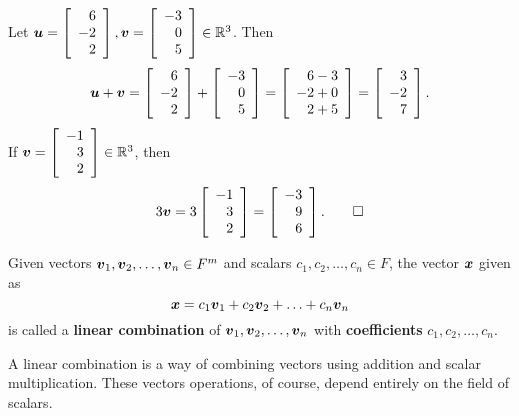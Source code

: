 \begin{Exam} Let $\bb u = \vr{ 6\\-2\\ 2}, \bb v = \vr{ -3\\0\\ 5} \in \R^3$. Then 
\[\bb u + \bb v = \vr{ 6\\-2\\ 2} + \vr{ -3\\0\\ 5} = \vr{ 6-3\\ -2+0\\ 2+5} = \vr{ 3\\ -2\\ 7}.\]
 If $\bb v = \vr{-1\\ 3\\2}\in \R^3$, then 
\[3\bb v = 3\vr{-1\\ 3\\2} = \vr{ -3\\ 9\\6}. \qedhere\]
\end{Exam}\vs

\begin{Def}\label{def:linearcombo} Given vectors $\bb v_1, \bb v_2, \ldots, \bb v_n\in F^m$ and scalars $c_1, c_2, \ldots, c_n\in F$, the vector $\bb x$ given as 
\[\bb x = c_1\bb v_1 + c_2\bb v_2 + \ldots + c_n\bb v_n\] is called a \textbf{linear combination} of $\bb v_1, \bb v_2, \ldots, \bb v_n$ with \textbf{coefficients} $c_1, c_2, \ldots, c_n$. \\
\end{Def}\vs

A linear combination is a way of combining vectors using addition and scalar multiplication. These vectors operations, of course, depend entirely on the field of scalars.\\

